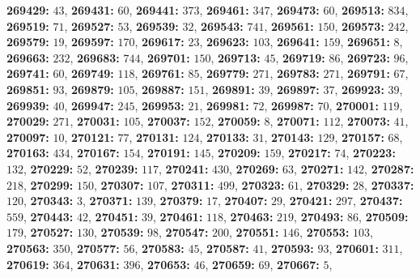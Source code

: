 \textsf{\bfseries 269429:} $43$, \textsf{\bfseries 269431:} $60$, \textsf{\bfseries 269441:} $373$, \textsf{\bfseries 269461:} $347$, \textsf{\bfseries 269473:} $60$, \textsf{\bfseries 269513:} $834$, \textsf{\bfseries 269519:} $71$, \textsf{\bfseries 269527:} $53$, \textsf{\bfseries 269539:} $32$, \textsf{\bfseries 269543:} $741$, \textsf{\bfseries 269561:} $150$, \textsf{\bfseries 269573:} $242$, \textsf{\bfseries 269579:} $19$, \textsf{\bfseries 269597:} $170$, \textsf{\bfseries 269617:} $23$, \textsf{\bfseries 269623:} $103$, \textsf{\bfseries 269641:} $159$, \textsf{\bfseries 269651:} $8$, \textsf{\bfseries 269663:} $232$, \textsf{\bfseries 269683:} $744$, \textsf{\bfseries 269701:} $150$, \textsf{\bfseries 269713:} $45$, \textsf{\bfseries 269719:} $86$, \textsf{\bfseries 269723:} $96$, \textsf{\bfseries 269741:} $60$, \textsf{\bfseries 269749:} $118$, \textsf{\bfseries 269761:} $85$, \textsf{\bfseries 269779:} $271$, \textsf{\bfseries 269783:} $271$, \textsf{\bfseries 269791:} $67$, \textsf{\bfseries 269851:} $93$, \textsf{\bfseries 269879:} $105$, \textsf{\bfseries 269887:} $151$, \textsf{\bfseries 269891:} $39$, \textsf{\bfseries 269897:} $37$, \textsf{\bfseries 269923:} $39$, \textsf{\bfseries 269939:} $40$, \textsf{\bfseries 269947:} $245$, \textsf{\bfseries 269953:} $21$, \textsf{\bfseries 269981:} $72$, \textsf{\bfseries 269987:} $70$, \textsf{\bfseries 270001:} $119$, \textsf{\bfseries 270029:} $271$, \textsf{\bfseries 270031:} $105$, \textsf{\bfseries 270037:} $152$, \textsf{\bfseries 270059:} $8$, \textsf{\bfseries 270071:} $112$, \textsf{\bfseries 270073:} $41$, \textsf{\bfseries 270097:} $10$, \textsf{\bfseries 270121:} $77$, \textsf{\bfseries 270131:} $124$, \textsf{\bfseries 270133:} $31$, \textsf{\bfseries 270143:} $129$, \textsf{\bfseries 270157:} $68$, \textsf{\bfseries 270163:} $434$, \textsf{\bfseries 270167:} $154$, \textsf{\bfseries 270191:} $145$, \textsf{\bfseries 270209:} $159$, \textsf{\bfseries 270217:} $74$, \textsf{\bfseries 270223:} $132$, \textsf{\bfseries 270229:} $52$, \textsf{\bfseries 270239:} $117$, \textsf{\bfseries 270241:} $430$, \textsf{\bfseries 270269:} $63$, \textsf{\bfseries 270271:} $142$, \textsf{\bfseries 270287:} $218$, \textsf{\bfseries 270299:} $150$, \textsf{\bfseries 270307:} $107$, \textsf{\bfseries 270311:} $499$, \textsf{\bfseries 270323:} $61$, \textsf{\bfseries 270329:} $28$, \textsf{\bfseries 270337:} $120$, \textsf{\bfseries 270343:} $3$, \textsf{\bfseries 270371:} $139$, \textsf{\bfseries 270379:} $17$, \textsf{\bfseries 270407:} $29$, \textsf{\bfseries 270421:} $297$, \textsf{\bfseries 270437:} $559$, \textsf{\bfseries 270443:} $42$, \textsf{\bfseries 270451:} $39$, \textsf{\bfseries 270461:} $118$, \textsf{\bfseries 270463:} $219$, \textsf{\bfseries 270493:} $86$, \textsf{\bfseries 270509:} $179$, \textsf{\bfseries 270527:} $130$, \textsf{\bfseries 270539:} $98$, \textsf{\bfseries 270547:} $200$, \textsf{\bfseries 270551:} $146$, \textsf{\bfseries 270553:} $103$, \textsf{\bfseries 270563:} $350$, \textsf{\bfseries 270577:} $56$, \textsf{\bfseries 270583:} $45$, \textsf{\bfseries 270587:} $41$, \textsf{\bfseries 270593:} $93$, \textsf{\bfseries 270601:} $311$, \textsf{\bfseries 270619:} $364$, \textsf{\bfseries 270631:} $396$, \textsf{\bfseries 270653:} $46$, \textsf{\bfseries 270659:} $69$, \textsf{\bfseries 270667:} $5$, 
